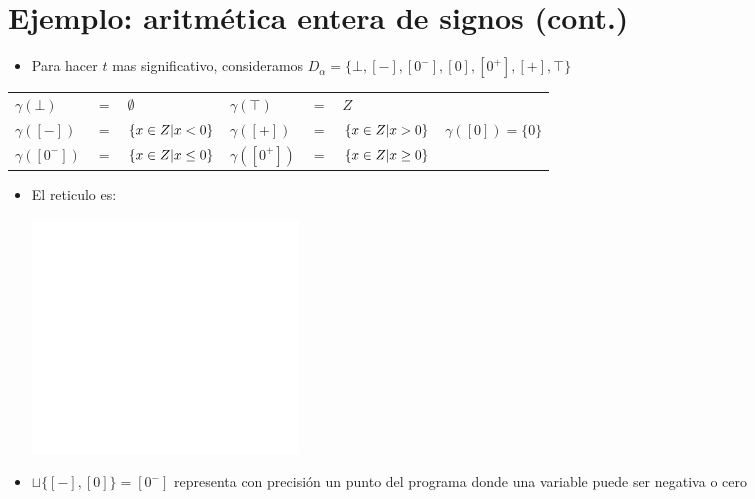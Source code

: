 \documentclass[11pt]{article}
\begin{document}
\section*{Ejemplo: aritmética entera de signos (cont.)}
\label{sec:org1ffe628}
\begin{itemize}
\item Para hacer \(t\) mas significativo, consideramos \(D_\alpha =
  \{\bot,[-],[0^-],[0],[0^+],[+],\top\}\)
\end{itemize}
\begin{center}
\begin{tabular}{lllllll}
\(\gamma(\bot)\) & \(=\) & \(\emptyset\) & \(\gamma(\top)\) & \(=\) & \(Z\) & \\
\(\gamma([-])\) & \(=\) & \(\{x \in Z \arrowvert x < 0 \}\) & \(\gamma([+])\) & \(=\) & \(\{x \in Z \arrowvert x > 0 \}\) & \(\gamma([0]) = \{0\}\)\\
\(\gamma([0^-])\) & \(=\) & \(\{x \in Z \arrowvert x \leq 0 \}\) & \(\gamma([0^+])\) & \(=\) & \(\{x \in Z \arrowvert x \geq 0 \}\) & \\
\end{tabular}
\end{center}
\begin{itemize}
\item El reticulo es: \begin{center}
\includegraphics[width=.9\linewidth]{reticext2.png}
\end{center}
\item \(\sqcup\{[-],[0]\} = [0^-]\) representa con precisión un punto del programa donde una variable puede ser negativa o cero
\end{itemize}
\end{document}
